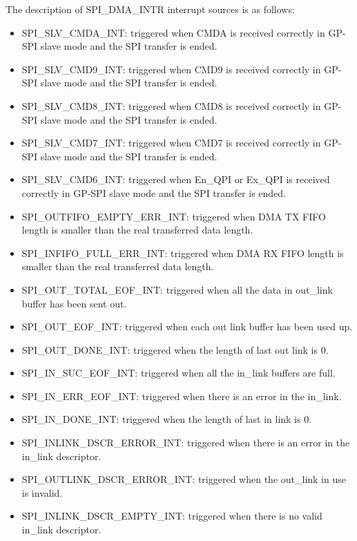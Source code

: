 \documentclass[main\_\_EN.tex]{subfiles}
\begin{document}
The description of SPI\_DMA\_INTR interrupt sources is as follows:
\begin{itemize}
\item \label{int:SPISLVCMDAINT} SPI\_SLV\_CMDA\_INT: triggered when CMDA is received correctly in GP-SPI slave mode and the SPI transfer is ended.

\item \label{int:SPISLVCMD9INT} SPI\_SLV\_CMD9\_INT: triggered when CMD9 is received correctly in GP-SPI slave mode and the SPI transfer is ended.

\item \label{int:SPISLVCMD8INT} SPI\_SLV\_CMD8\_INT: triggered when CMD8 is received correctly in GP-SPI slave mode and the SPI transfer is ended.

\item \label{int:SPISLVCMD7INT} SPI\_SLV\_CMD7\_INT: triggered when CMD7 is received correctly in GP-SPI slave mode and the SPI transfer is ended.

\item \label{int:SPISLVCMD6INT} SPI\_SLV\_CMD6\_INT: triggered when En\_QPI or Ex\_QPI is received correctly in GP-SPI slave mode and the SPI transfer is ended.

\item \label{int:SPIOUTFIFOEMPTYERRINT}SPI\_OUTFIFO\_EMPTY\_ERR\_INT: triggered when DMA TX FIFO length is smaller than the real transferred data length.
\item \label{int:SPIINFIFOFULLERRINT}SPI\_INFIFO\_FULL\_ERR\_INT: triggered when DMA RX FIFO length is smaller than the real transferred data length.
\item \label{int:SPIOUTTOTALEOFINT}SPI\_OUT\_TOTAL\_EOF\_INT: triggered when all the data in out\_link buffer has been sent out.
\item \label{int:SPIOUTEOFINT}SPI\_OUT\_EOF\_INT: triggered when each out link buffer has been used up.
\item \label{int:SPIOUTDONEINT}SPI\_OUT\_DONE\_INT: triggered when the length of last out link is 0.
\item \label{int:SPIINSUCEOFINT}SPI\_IN\_SUC\_EOF\_INT: triggered when all the in\_link buffers are full.
\item \label{int:SPIINERREOFINT}SPI\_IN\_ERR\_EOF\_INT: triggered when there is an error in the in\_link.
\item \label{int:SPIINDONEINT}SPI\_IN\_DONE\_INT: triggered when the length of last in link is 0.
\item \label{int:SPIINLINKDSCRERRORINT}SPI\_INLINK\_DSCR\_ERROR\_INT: triggered when there is an error in the in\_link descriptor.
\item \label{int:SPIOUTLINKDSCRERRORINT}SPI\_OUTLINK\_DSCR\_ERROR\_INT: triggered when the out\_link in use is invalid.
\item \label{int:SPIINLINKDSCREMPTYINT}SPI\_INLINK\_DSCR\_EMPTY\_INT: triggered when there is no valid in\_link descriptor.
\end{itemize}
\end{document}
